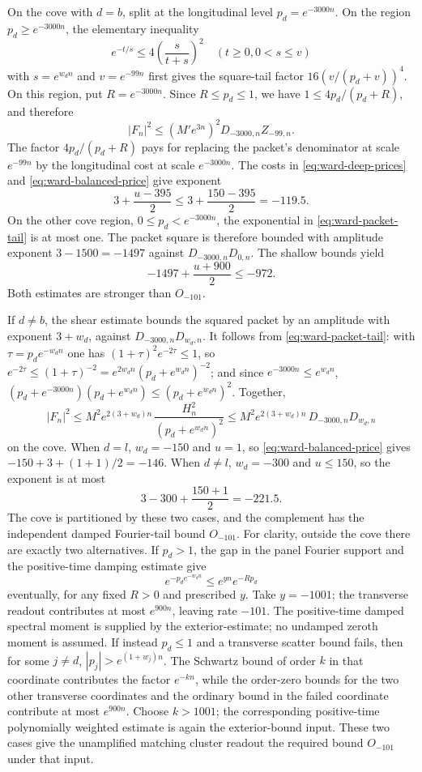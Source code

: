 On the cove with $d=b$, split at the longitudinal level
$p_d=e^{-3000n}$.  On the region $p_d\geq e^{-3000n}$, the elementary inequality
\[
 e^{-t/s}\leq 4\left(\frac{s}{t+s}\right)^2
 \quad(t\geq0, 0<s\leq v)
\]
with $s=e^{w_dn}$ and $v=e^{-99n}$ first gives the square-tail factor
$16(v/(p_d+v))^4$.  On this region, put $R=e^{-3000n}$.  Since
$R\leq p_d\leq1$, we have $1\leq4p_d/(p_d+R)$, and therefore
\[
 |F_n|^2\leq (M' e^{3n})^2D_{-3000,n}Z_{-99,n}.
\]
The factor $4p_d/(p_d+R)$ pays for replacing the packet's denominator at
scale $e^{-99n}$ by the longitudinal cost at scale $e^{-3000n}$.  The costs in
\eqref{eq:ward-deep-prices} and
\eqref{eq:ward-balanced-price} give exponent
\[
 3+\frac{u-395}{2}\leq 3+\frac{150-395}{2}=-119.5.
\]
On the other cove region, $0\leq p_d<e^{-3000n}$, the exponential in
\eqref{eq:ward-packet-tail} is at most one.  The packet square is therefore
bounded with amplitude exponent $3-1500=-1497$ against
$D_{-3000,n}D_{0,n}$.  The shallow bounds yield
\[
 -1497+\frac{u+900}{2}\leq -972.
\]
Both estimates are stronger than $O_{-101}$.

If $d\ne b$, the shear estimate bounds the squared packet by an amplitude
with exponent $3+w_d$, against $D_{-3000,n}D_{w_d,n}$.  It follows from
\eqref{eq:ward-packet-tail}: with $\tau=p_de^{-w_dn}$ one has
$(1+\tau)^2e^{-2\tau}\le1$, so
$e^{-2\tau}\le(1+\tau)^{-2}=e^{2w_dn}(p_d+e^{w_dn})^{-2}$; and since
$e^{-3000n}\le e^{w_dn}$,
$(p_d+e^{-3000n})(p_d+e^{w_dn})\le(p_d+e^{w_dn})^2$.  Together,
\[
 |F_n|^2\le M^2e^{2(3+w_d)n}\,\frac{H_n^2}{(p_d+e^{w_dn})^2}
 \le M^2e^{2(3+w_d)n}\,D_{-3000,n}D_{w_d,n}
\]
on the cove.  When $d=l$,
$w_d=-150$ and $u=1$, so \eqref{eq:ward-balanced-price} gives
$-150+3+(1+1)/2=-146$.  When $d\ne l$, $w_d=-300$ and $u\leq150$,
so the exponent is at most
\[
 3-300+\frac{150+1}{2}=-221.5.
\]
The cove is partitioned by these two cases, and the complement has the
independent damped Fourier-tail bound $O_{-101}$.  For clarity, outside the
cove there are exactly two alternatives.  If $p_d>1$, the gap in the panel
Fourier support and the positive-time damping estimate give
\[
 e^{-p_de^{-w_dn}}\leq e^{yn}e^{-Rp_d}
\]
eventually, for any fixed $R>0$ and prescribed $y$.  Take $y=-1001$;
the transverse readout contributes at most $e^{900n}$, leaving rate
$-101$.  The positive-time damped spectral moment is supplied by the
exterior-estimate; no undamped zeroth moment is assumed.  If
instead $p_d\leq1$
and a transverse scatter bound fails, then for some $j\ne d$,
$|p_j|>e^{(1+w_j)n}$.  The Schwartz bound of order $k$ in that coordinate
contributes the factor $e^{-kn}$, while the order-zero bounds for the two
other transverse coordinates and the ordinary bound in the failed
coordinate contribute at most $e^{900n}$.  Choose $k>1001$; the
corresponding positive-time polynomially weighted estimate is again the
exterior-bound input.  These two cases give the unamplified matching
cluster readout the required bound $O_{-101}$ under that input.

